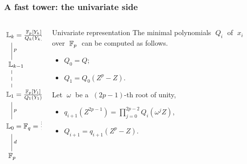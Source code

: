 \documentclass[10pt,usepdftitle=false]{beamer}
\begin{document}
\begin{frame}
  \frametitle{A fast tower: the univariate side}

  \vspace{-2mm}

  \begin{columns}
    \begin{column}{0.3\textwidth}
      \Large$\xymatrix{
        *+[r]{\LK_k = \frac{\F_p[Y_k]}{Q_k(Y_k)}}\ar@{-}[d]^p\\
        *+[r]{\LK_{k-1}} \ar@{--}[d]\\
        *+[r]{\LK_1 = \frac{\F_p[Y_1]}{Q_1(Y_1)}} \ar@{-}[d]^p\\
        *+[r]{\LK_0 = \F_q = \frac{\F_p[X_0]}{Q(X_0)}} \ar@{-}[d]^d\\
        *+[r]{\F_p}
      }$    
    \end{column}
    \begin{column}{0.65\textwidth}
      \begin{block}{Univariate representation}
        The minimal polynomials $\;Q_i\;$ of $\;x_i\;$ over $\;\mathbb{F}_p\;$
        can be computed as follows.
        \begin{itemize}
        \item $Q_0 = Q$;
        \item $Q_1 = Q_0(Z^p-Z)$.
        \end{itemize}
        Let $\;\omega\;$ be a $\;(2p-1)$-th root of unity,
        \begin{itemize}
        \item $q_{i+1}(Z^{2p-1}) = \prod_{j=0}^{2p-2}Q_i(\omega^jZ)$,
        \item $Q_{i+1} = q_{i+1}(Z^p-Z)$.
        \end{itemize}
      \end{block}
    \end{column}
  \end{columns}
\end{frame}

\end{document}
